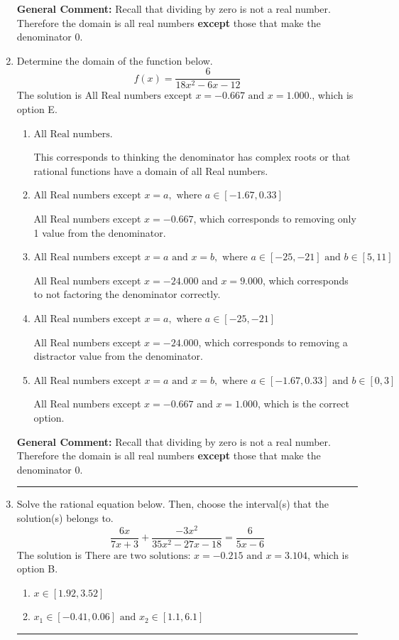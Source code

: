 \documentclass{extbook}[14pt]
\newcommand{\litem}[1]{\item #1

\rule{\textwidth}{0.4pt}}
\begin{document}
\begin{enumerate}
{\textbf{General Comment:} Recall that dividing by zero is not a real number. Therefore the domain is all real numbers \textbf{except} those that make the denominator 0.
}
\litem{
Determine the domain of the function below.
\[ f(x) = \frac{6}{18x^{2} -6 x -12} \]The solution is \( \text{All Real numbers except } x = -0.667 \text{ and } x = 1.000. \), which is option E.\begin{enumerate}[label=\Alph*.]
\item \( \text{All Real numbers.} \)

This corresponds to thinking the denominator has complex roots or that rational functions have a domain of all Real numbers.
\item \( \text{All Real numbers except } x = a, \text{ where } a \in [-1.67, 0.33] \)

All Real numbers except $x = -0.667$, which corresponds to removing only 1 value from the denominator.
\item \( \text{All Real numbers except } x = a \text{ and } x = b, \text{ where } a \in [-25, -21] \text{ and } b \in [5, 11] \)

All Real numbers except $x = -24.000$ and $x = 9.000$, which corresponds to not factoring the denominator correctly.
\item \( \text{All Real numbers except } x = a, \text{ where } a \in [-25, -21] \)

All Real numbers except $x = -24.000$, which corresponds to removing a distractor value from the denominator.
\item \( \text{All Real numbers except } x = a \text{ and } x = b, \text{ where } a \in [-1.67, 0.33] \text{ and } b \in [0, 3] \)

All Real numbers except $x = -0.667$ and $x = 1.000$, which is the correct option.
\end{enumerate}

\textbf{General Comment:} Recall that dividing by zero is not a real number. Therefore the domain is all real numbers \textbf{except} those that make the denominator 0.
}
\litem{
Solve the rational equation below. Then, choose the interval(s) that the solution(s) belongs to.
\[ \frac{6x}{7x + 3} + \frac{-3x^{2}}{35x^{2} -27 x -18} = \frac{6}{5x -6} \]The solution is \( \text{There are two solutions: } x = -0.215 \text{ and } x = 3.104 \), which is option B.\begin{enumerate}[label=\Alph*.]
\item \( x \in [1.92,3.52] \)


\item \( x_1 \in [-0.41, 0.06] \text{ and } x_2 \in [1.1,6.1] \)


\end{enumerate}}
\end{enumerate}
\end{document}

